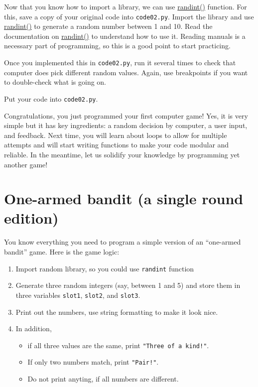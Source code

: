 \documentclass[
]{book}
\providecommand{\tightlist}{%
  \setlength{\itemsep}{0pt}\setlength{\parskip}{0pt}}
\begin{document}
Now that you know how to import a library, we can use \href{https://docs.python.org/3/library/random.html\#random.randint}{randint()} function. For this, save a copy of your original code into \texttt{code02.py}. Import the library and use \href{https://docs.python.org/3/library/random.html\#random.randint}{randint()} to generate a random number between 1 and 10. Read the documentation on \href{https://docs.python.org/3/library/random.html\#random.randint}{randint()} to understand how to use it. Reading manuals is a necessary part of programming, so this is a good point to start practicing.

Once you implemented this in \texttt{code02.py}, run it several times to check that computer does pick different random values. Again, use breakpoints if you want to double-check what is going on.

Put your code into \texttt{code02.py}.

Congratulations, you just programmed your first computer game! Yes, it is very simple but it has key ingredients: a random decision by computer, a user input, and feedback. Next time, you will learn about loops to allow for multiple attempts and will start writing functions to make your code modular and reliable. In the meantime, let us solidify your knowledge by programming yet another game!

\hypertarget{one-armed-bandit-a-single-round-edition}{%
\section{One-armed bandit (a single round edition)}\label{one-armed-bandit-a-single-round-edition}}

You know everything you need to program a simple version of an ``one-armed bandit'' game. Here is the game logic:

\begin{enumerate}
\def\labelenumi{\arabic{enumi}.}
\tightlist
\item
  Import random library, so you could use \texttt{randint} function
\item
  Generate three random integers (say, between 1 and 5) and store them in three variables \texttt{slot1}, \texttt{slot2}, and \texttt{slot3}.
\item
  Print out the numbers, use string formatting to make it look nice.
\item
  In addition,

  \begin{itemize}
  \tightlist
  \item
    if all three values are the same, print \texttt{"Three\ of\ a\ kind!"}.
  \item
    If only two numbers match, print \texttt{"Pair!"}.
  \item
    Do not print anyting, if all numbers are different.
  \end{itemize}
\end{enumerate}
\end{document}
